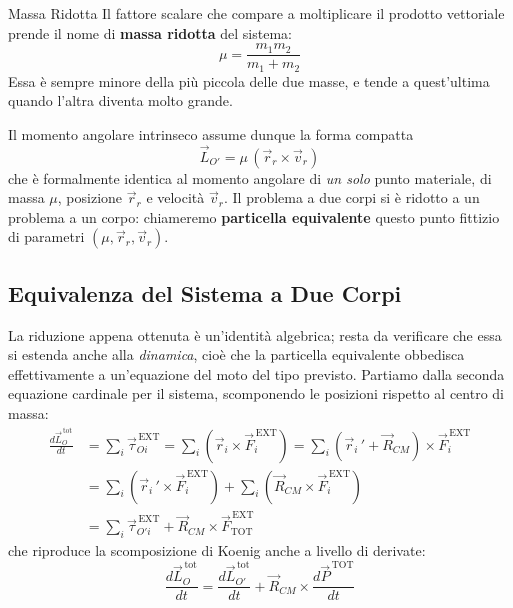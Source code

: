 \begin{definizione}{Massa Ridotta}
Il fattore scalare che compare a moltiplicare il prodotto vettoriale prende il nome di \textbf{massa ridotta} del sistema:
\begin{equation}
    \mu = \frac{m_1 m_2}{m_1+m_2}
\end{equation}
Essa è sempre minore della più piccola delle due masse, e tende a quest'ultima quando l'altra diventa molto grande.
\end{definizione}

Il momento angolare intrinseco assume dunque la forma compatta
\begin{equation}
    \vec{L}_{O'} = \mu \,(\vec{r}_r \times \vec{v}_r)
\end{equation}
che è formalmente identica al momento angolare di \emph{un solo} punto materiale, di massa $\mu$, posizione $\vec{r}_r$ e velocità $\vec{v}_r$. Il problema a due corpi si è ridotto a un problema a un corpo: chiameremo \textbf{particella equivalente} questo punto fittizio di parametri $(\mu, \vec{r}_r, \vec{v}_r)$.

\subsection{Equivalenza del Sistema a Due Corpi}

La riduzione appena ottenuta è un'identità algebrica; resta da verificare che essa si estenda anche alla \emph{dinamica}, cioè che la particella equivalente obbedisca effettivamente a un'equazione del moto del tipo previsto. Partiamo dalla seconda equazione cardinale per il sistema, scomponendo le posizioni rispetto al centro di massa:
\begin{align}
    \frac{d\vec{L}_O^{\,\text{tot}}}{dt}
    &= \sum_i \vec{\tau}_{Oi}^{\,\text{EXT}} = \sum_i (\vec{r}_i \times \vec{F}_i^{\,\text{EXT}})
     = \sum_i (\vec{r}_i\,' + \vec{R}_{CM}) \times \vec{F}_i^{\,\text{EXT}} \\
    &= \sum_i (\vec{r}_i\,' \times \vec{F}_i^{\,\text{EXT}}) + \sum_i (\vec{R}_{CM} \times \vec{F}_i^{\,\text{EXT}}) \\
    &= \sum_i \vec{\tau}_{O'i}^{\,\text{EXT}} + \vec{R}_{CM} \times \vec{F}_{\text{TOT}}^{\,\text{EXT}}
\end{align}
che riproduce la scomposizione di Koenig anche a livello di derivate:
\begin{equation*}
    \frac{d\vec{L}_O^{\,\text{tot}}}{dt}
    = \frac{d\vec{L}_{O'}^{\,\text{tot}}}{dt} + \vec{R}_{CM} \times \frac{d\vec{P}^{\,\text{TOT}}}{dt}
\end{equation*}

